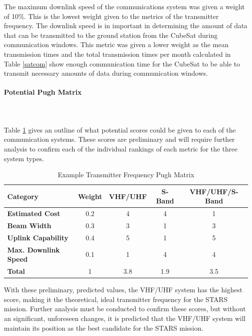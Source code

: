 The maximum downlink speed of the communications system was given a weight of 10\%. This is the lowest weight given to the metrics of the transmitter frequency. The downlink speed is in important in determining the amount of data that can be transmitted to the ground station from the CubeSat during communication windows. This metric was given a lower weight as the mean transmission times and the total transmission times per month calculated in Table \ref{satcom} show enough communication time for the CubeSat to be able to transmit necessary amounts of data during communication windows. 

\paragraph{Potential Pugh Matrix} ~\\~\\
Table \ref{tbl:transmitter_pugh} gives an outline of what potential scores could be given to each of the communication systems. These scores are preliminary and will require further analysis to confirm each of the individual rankings of each metric for the three system types. 
\begin{table}[H]
\centering
\begin{tabular}{|l|c|c|c|c|} 
\hline
    \textbf{Category} & \textbf{Weight} & \textbf{VHF/UHF} & \textbf{S-Band} & \textbf{VHF/UHF/S-Band}
    \\
\hline
    \textbf{Estimated Cost} & 0.2 & 4 & 4 & 1
    \\
\hline
    \textbf{Beam Width} & 0.3 & 3 & 1 & 3
    \\
\hline
    \textbf{Uplink Capability} & 0.4 & 5 & 1 & 5
    \\
\hline
    \textbf{Max. Downlink Speed} & 0.1 & 1 & 4 & 4
    \\
\hline
    \textbf{Total} & 1 & 3.8 & 1.9 & 3.5
    \\
\hline
\end{tabular}
\caption{Example Transmitter Frequency Pugh Matrix }
\label{tbl:transmitter_pugh}
\end{table}

With these preliminary, predicted values, the VHF/UHF system has the highest score, making it the theoretical, ideal transmitter frequency for the STARS mission. Further analysis must be conducted to confirm these scores, but without an significant, unforeseen changes, it is predicted that the VHF/UHF system will maintain its position as the best candidate for the STARS mission. 

